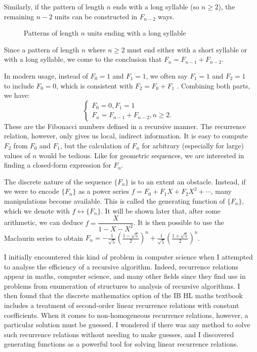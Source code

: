 \documentclass[a4paper, 12pt]{report}
\begin{document}
Similarly, if the pattern of length $n$ ends with a long syllable (so $n \geq 2$), the remaining $n - 2$ units can be constructed in $F_{n - 2}$ ways.

\begin{figure}[h]
    \centering
    \caption{Patterns of length $n$ units ending with a long syllable}
    \label{fig:end_with_long}
\end{figure}

Since a pattern of length $n$ where $n \geq 2$ must end either with a short syllable or with a long syllable, we come to the conclusion that $F_n = F_{n - 1} + F_{n - 2}$.

In modern usage, instead of $F_0 = 1$ and $F_1 = 1$, we often say $F_1 = 1$ and $F_2 = 1$ to include $F_0 = 0$, which is consistent with $F_2 = F_0 + F_1$ \autocite[293]{gkp}. Combining both parts, we have:
\[\begin{cases}
F_0 = 0, F_1 = 1\\
F_n = F_{n - 1} + F_{n - 2}, n \geq 2.
\end{cases}\]
These are the Fibonacci numbers defined in a recursive manner. The recurrence relation, however, only gives us local, indirect information. It is easy to compute $F_2$ from $F_0$ and $F_1$, but the calculation of $F_n$ for arbitrary (especially for large) values of $n$ would be tedious. Like for geometric sequences, we are interested in finding a closed-form expression for $F_n$.

The discrete nature of the sequence $\{F_n\}$ is to an extent an obstacle. Instead, if we were to encode $\{F_n\}$ as a power series $f = F_0 + F_1 X + F_2 X^2 + \cdots$, many manipulations become available. This is called the generating function of $\{F_n\}$, which we denote with $f \longleftrightarrow \{F_n\}$. It will be shown later that, after some arithmetic, we can deduce $f = \dfrac{X}{1 - X - X^2}$. It is then possible to use the Maclaurin series to obtain $F_n = -\frac{1}{\sqrt{5}} \left(\frac{1 - \sqrt{5}}{2}\right)^n + \frac{1}{\sqrt{5}} \left(\frac{1 + \sqrt{5}}{2}\right)^n$.

I initially encountered this kind of problem in computer science when I attempted to analyse the efficiency of a recursive algorithm. Indeed, recurrence relations appear in maths, computer science, and many other fields since they find use in problems from enumeration of structures to analysis of recursive algorithms. I then found that the discrete mathematics option of the IB HL maths textbook includes a treatment of second-order linear recurrence relations with constant coefficients. When it comes to non-homogeneous recurrence relations, however, a particular solution must be guessed. I wondered if there was any method to solve such recurrence relations without needing to make guesses, and I discovered generating functions as a powerful tool for solving linear recurrence relations.
\end{document}
